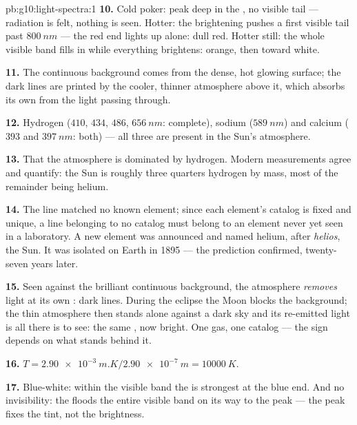 \begin{solution}{pb:g10:light-spectra:1}
\textbf{10.} Cold poker: peak deep in the , no visible tail ---
radiation is felt, nothing is seen. Hotter: the brightening 
pushes a first visible tail past $\qty{800}{nm}$ --- the red end lights
up alone: dull red. Hotter still: the whole visible band fills in while
everything brightens: orange, then toward white.

\textbf{11.} The continuous background comes from the dense, hot glowing
surface; the dark lines are printed by the cooler, thinner atmosphere
above it, which absorbs its own  from the light passing
through.

\textbf{12.} Hydrogen ($410$, $434$, $486$, $\qty{656}{nm}$: complete),
sodium ($\qty{589}{nm}$) and calcium ($393$ and $\qty{397}{nm}$: both)
--- all three are present in the Sun's atmosphere.

\textbf{13.} That the atmosphere is dominated by hydrogen. Modern
measurements agree and quantify: the Sun is roughly three quarters
hydrogen by mass, most of the remainder being helium.

\textbf{14.} The line matched no known element; since each element's
catalog is fixed and unique, a line belonging to no catalog must belong
to an element never yet seen in a laboratory. A new element was
announced and named helium, after \emph{helios}, the Sun. It was
isolated on Earth in 1895 --- the prediction confirmed, twenty-seven
years later.

\textbf{15.} Seen against the brilliant continuous background, the
atmosphere \emph{removes} light at its own : dark lines.
During the eclipse the Moon blocks the background; the thin atmosphere
then stands alone against a dark sky and its re-emitted light is all
there is to see: the same , now bright. One gas, one catalog
--- the sign depends on what stands behind it.

\textbf{16.} $T = \qty{2.90e-3}{m.K} / \qty{2.90e-7}{m}
= \qty{10000}{K}$.

\textbf{17.} Blue-white: within the visible band the  is
strongest at the blue end. And no invisibility: the 
floods the entire visible band on its way to the  peak ---
the peak fixes the tint, not the brightness.


\end{solution}
